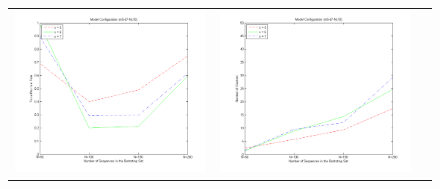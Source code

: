 \begin{figure}[t]
  \centering
  \begin{tabular}{ccc}
    \includegraphics[scale=0.33]{figures/m5-d7-Nc10-fp-rate} &
    \includegraphics[scale=0.33]{figures/m5-d7-Nc10-number-of-clusters} \\

\end{tabular}
\end{figure}
